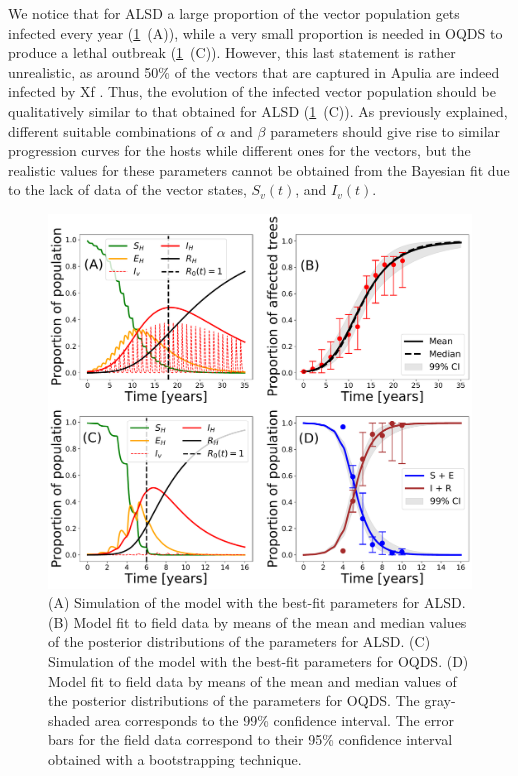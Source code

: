 We notice that for ALSD a large proportion of the vector population gets
infected every year (\cref{fig:best_fit_model}~\textcolor{ref_color}{(A)}),
while a very small
proportion is needed in OQDS to produce a lethal outbreak
(\cref{fig:best_fit_model}~\textcolor{ref_color}{(C)}). However, this last
statement is rather
unrealistic, as around 50\% of the vectors that are captured in Apulia are
indeed infected by Xf \cite{Cavalieri2019,cornara2017transmission}. Thus, the
evolution of the infected vector population should be qualitatively similar to
that obtained for ALSD (\cref{fig:best_fit_model}~\textcolor{ref_color}{(C)}).
As previously
explained,
different suitable combinations of $\alpha$ and $\beta$ parameters should give
rise to similar progression curves for the hosts while different ones for the
vectors, but the realistic values for these parameters cannot be obtained from
the Bayesian fit due to the lack of data of the vector states, $S_v(t)$, and
$I_v(t)$.

\begin{figure}[H]
    \centering
    \includegraphics[width=1\textwidth]{Figures/BayesianInference.pdf}
    \caption[Best-fit model to the field data for ALSD and OQDS]{(A) Simulation
        of the model with the best-fit parameters for
        ALSD. (B) Model fit to field data by means of the mean and median
        values of the posterior distributions of the parameters for ALSD. (C)
        Simulation of the model with the best-fit parameters for OQDS. (D)
        Model fit to field data by means of the mean and median values of the
        posterior distributions of the parameters for OQDS. The gray-shaded
        area corresponds to the 99\% confidence interval. The error bars for
        the field data correspond to their 95\% confidence interval obtained
        with a bootstrapping technique.}
    \label{fig:best_fit_model}
\end{figure}


